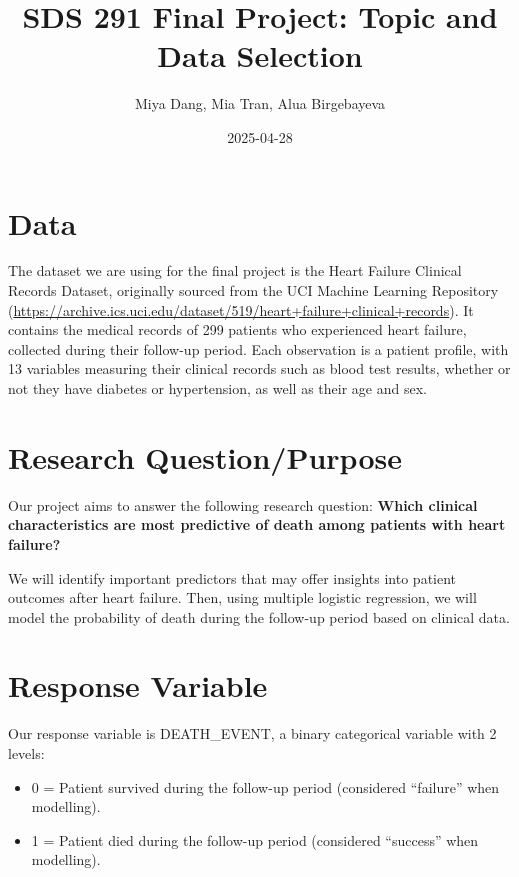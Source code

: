 \documentclass[
  letterpaper,
  DIV=11,
  numbers=noendperiod]{scrartcl}
\title{SDS 291 Final Project: Topic and Data Selection}
\author{Miya Dang, Mia Tran, Alua Birgebayeva}
\date{2025-04-28}
\begin{document}
\maketitle
\ifdefined\Shaded\renewenvironment{Shaded}{\begin{tcolorbox}[boxrule=0pt, frame hidden, sharp corners, borderline west={3pt}{0pt}{shadecolor}, enhanced, interior hidden, breakable]}{\end{tcolorbox}}\fi

\hypertarget{data}{%
\section{Data}\label{data}}

The dataset we are using for the final project is the Heart Failure
Clinical Records Dataset, originally sourced from the UCI Machine
Learning Repository
(\url{https://archive.ics.uci.edu/dataset/519/heart+failure+clinical+records}).
It contains the medical records of 299 patients who experienced heart
failure, collected during their follow-up period. Each observation is a
patient profile, with 13 variables measuring their clinical records such
as blood test results, whether or not they have diabetes or
hypertension, as well as their age and sex.

\hypertarget{research-questionpurpose}{%
\section{Research Question/Purpose}\label{research-questionpurpose}}

Our project aims to answer the following research question:
\textbf{Which clinical characteristics are most predictive of death
among patients with heart failure?}

We will identify important predictors that may offer insights into
patient outcomes after heart failure. Then, using multiple logistic
regression, we will model the probability of death during the follow-up
period based on clinical data.

\hypertarget{response-variable}{%
\section{Response Variable}\label{response-variable}}

Our response variable is DEATH\_EVENT, a binary categorical variable
with 2 levels:

\begin{itemize}
\item
  0 = Patient survived during the follow-up period (considered
  ``failure'' when modelling).
\item
  1 = Patient died during the follow-up period (considered ``success''
  when modelling).
\end{itemize}
\end{document}
